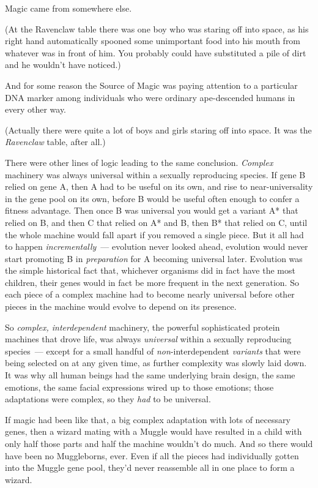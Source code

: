 Magic came from somewhere else.

(At the Ravenclaw table there was one boy who was staring off into space, as his right hand automatically spooned some unimportant food into his mouth from whatever was in front of him. You probably could have substituted a pile of dirt and he wouldn't have noticed.)

And for some reason the Source of Magic was paying attention to a particular DNA marker among individuals who were ordinary ape-descended humans in every other way.

(Actually there were quite a lot of boys and girls staring off into space. It was the \emph{Ravenclaw} table, after all.)

There were other lines of logic leading to the same conclusion. \emph{Complex} machinery was always universal within a sexually reproducing species. If gene B relied on gene A, then A had to be useful on its own, and rise to near-universality in the gene pool on its own, before B would be useful often enough to confer a fitness advantage. Then once B was universal you would get a variant A* that relied on B, and then C that relied on A* and B, then B* that relied on C, until the whole machine would fall apart if you removed a single piece. But it all had to happen \emph{incrementally}~--- evolution never looked ahead, evolution would never start promoting B in \emph{preparation} for A becoming universal later. Evolution was the simple historical fact that, whichever organisms did in fact have the most children, their genes would in fact be more frequent in the next generation. So each piece of a complex machine had to become nearly universal before other pieces in the machine would evolve to depend on its presence.

So \emph{complex, interdependent} machinery, the powerful sophisticated protein machines that drove life, was always \emph{universal} within a sexually reproducing species~--- except for a small handful of \emph{non}-interdependent \emph{variants} that were being selected on at any given time, as further complexity was slowly laid down. It was why all human beings had the same underlying brain design, the same emotions, the same facial expressions wired up to those emotions; those adaptations were complex, so they \emph{had} to be universal.

If magic had been like that, a big complex adaptation with lots of necessary genes, then a wizard mating with a Muggle would have resulted in a child with only half those parts and half the machine wouldn't do much. And so there would have been no Muggleborns, ever. Even if all the pieces had individually gotten into the Muggle gene pool, they'd never reassemble all in one place to form a wizard.

